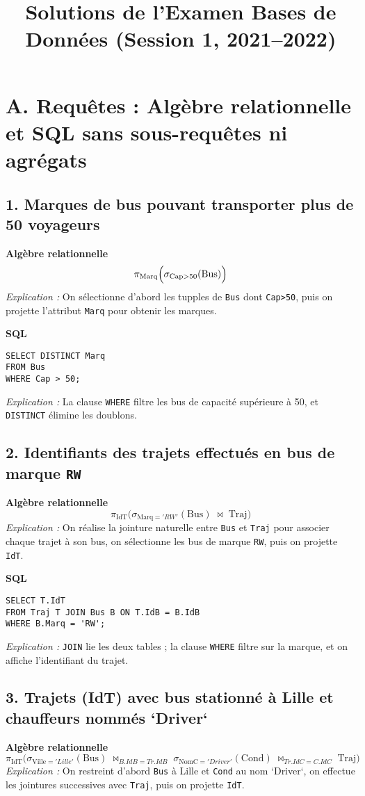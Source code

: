 \documentclass[a4paper,11pt]{article}
\title{\textbf{Solutions de l'Examen Bases de Données (Session 1, 2021--2022)}}
\date{}
\begin{document}
\maketitle

\section*{A. Requêtes : Algèbre relationnelle et SQL sans sous-requêtes ni agrégats}
\subsection*{1. Marques de bus pouvant transporter plus de 50 voyageurs}
\textbf{Algèbre relationnelle}\[
  \pi_{\text{Marq}}\Bigl(\sigma_{\text{Cap}>50}(\text{Bus})\Bigr)
\]
\textit{Explication :} On sélectionne d'abord les tupples de \texttt{Bus} dont \texttt{Cap>50}, puis on projette l'attribut \texttt{Marq} pour obtenir les marques.

\textbf{SQL}
\begin{verbatim}
SELECT DISTINCT Marq
FROM Bus
WHERE Cap > 50;
\end{verbatim}
\textit{Explication :} La clause \texttt{WHERE} filtre les bus de capacité supérieure à 50, et \texttt{DISTINCT} élimine les doublons.

\subsection*{2. Identifiants des trajets effectués en bus de marque \texttt{RW}}  
\textbf{Algèbre relationnelle}\[
  \pi_{\text{IdT}}\bigl(\sigma_{\text{Marq}='RW'}(\text{Bus}) \;\bowtie\; \text{Traj}\bigr)
\]
\textit{Explication :} On réalise la jointure naturelle entre \texttt{Bus} et \texttt{Traj} pour associer chaque trajet à son bus, on sélectionne les bus de marque \texttt{RW}, puis on projette \texttt{IdT}.

\textbf{SQL}
\begin{verbatim}
SELECT T.IdT
FROM Traj T JOIN Bus B ON T.IdB = B.IdB
WHERE B.Marq = 'RW';
\end{verbatim}
\textit{Explication :} \texttt{JOIN} lie les deux tables ; la clause \texttt{WHERE} filtre sur la marque, et on affiche l'identifiant du trajet.

\subsection*{3. Trajets (IdT) avec bus stationné à Lille et chauffeurs nommés `Driver`}  
\textbf{Algèbre relationnelle}\[
  \pi_{\text{IdT}}\bigl(\sigma_{\text{Ville}='Lille'}(\text{Bus}) \;\bowtie_{B.IdB=Tr.IdB}\; \sigma_{\text{NomC}='Driver'}(\text{Cond}) \;\bowtie_{Tr.IdC=C.IdC}\; \text{Traj}\bigr)
\]
\textit{Explication :} On restreint d'abord \texttt{Bus} à Lille et \texttt{Cond} au nom `Driver`, on effectue les jointures successives avec \texttt{Traj}, puis on projette \texttt{IdT}.
\end{document}
